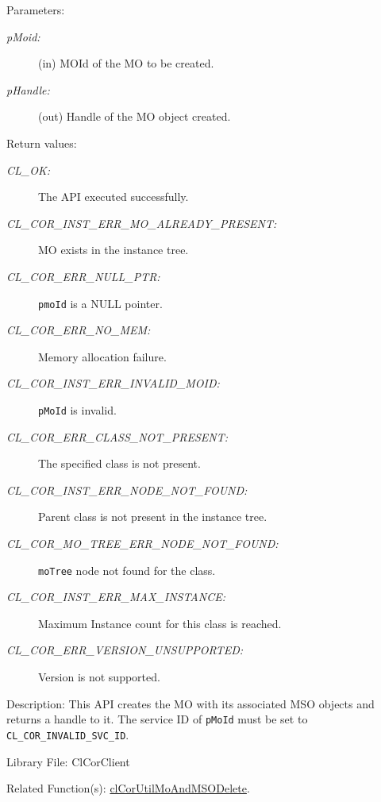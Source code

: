 \begin{flushleft}
\begin{Desc}
\begin{verbatim}
\end{verbatim}
\normalsize
\end{Desc}
\begin{Desc}
\item[Parameters:]
\begin{description}
\item[{\em p\-Moid:}](in) MOId of the MO to be created.
\item[{\em p\-Handle:}](out) Handle of the MO object created.\end{description}
\end{Desc}

\begin{Desc}
\item[Return values:]
\begin{description}
\item[{\em CL\_\-OK:}]The API executed successfully. 
\item[{\em CL\_\-COR\_\-INST\_\-ERR\_\-MO\_\-ALREADY\_\-PRESENT:}] MO exists in the instance tree.
\item[{\em CL\_\-COR\_\-ERR\_\-NULL\_\-PTR:}] {\tt{pmoId}} is a NULL pointer.
\item[{\em CL\_\-COR\_\-ERR\_\-NO\_\-MEM:}] Memory allocation failure.
\item[{\em CL\_\-COR\_\-INST\_\-ERR\_\-INVALID\_\-MOID:}] {\tt{pMoId}} is invalid.
\item[{\em CL\_\-COR\_\-ERR\_\-CLASS\_\-NOT\_\-PRESENT:}] The specified class is not present.
\item[{\em CL\_\-COR\_\-INST\_\-ERR\_\-NODE\_\-NOT\_\-FOUND:}] Parent class is not present in the instance tree. 
\item[{\em CL\_\-COR\_\-MO\_\-TREE\_\-ERR\_\-NODE\_\-NOT\_\-FOUND:}] {\tt{moTree}} node not found for the class. 
\item[{\em CL\_\-COR\_\-INST\_\-ERR\_\-MAX\_\-INSTANCE:}] Maximum Instance count for this class is reached.  
\item[{\em CL\_\-COR\_\-ERR\_\-VERSION\_\-UNSUPPORTED:}] Version is not supported.
\end{description}
\end{Desc}

\begin{Desc}
\item[Description:] This API creates the MO with its associated MSO objects and returns a handle to it. The service ID of 
{\tt{pMoId}} must be set to {\tt{CL\_\-COR\_\-INVALID\_\-SVC\_\-ID}}. 
\end{Desc}
\begin{Desc}
\item[Library File:]Cl\-Cor\-Client\end{Desc}
\begin{Desc}
\item[Related Function(s):]\hyperlink{pagecor104}{clCorUtilMoAndMSODelete}. \end{Desc}
\newpage




\end{flushleft}
